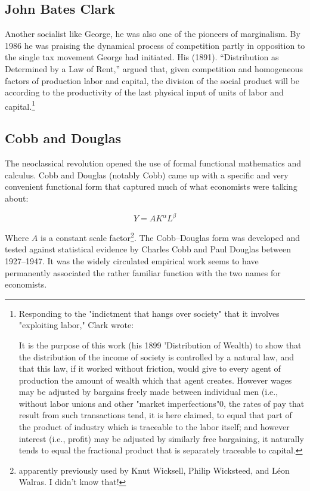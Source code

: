   \subsection{John Bates Clark}
  Another socialist like George, he was also one of the pioneers of marginalism. By 1986 he was praising the dynamical process of competition partly in opposition to the single tax movement George had initiated.  His (1891). ``Distribution as Determined by a Law of Rent,'' argued that, given  competition and homogeneous factors of production labor and capital, the division of the social product will be according to the productivity of the last physical input of units of labor and capital.\footnote{Responding to the "indictment that hangs over society" that it involves "exploiting labor," Clark wrote:

    It is the purpose of this work (his 1899 'Distribution of Wealth) to show that the distribution of the income of society is controlled by a natural law, and that this law, if it worked without friction, would give to every agent of production the amount of wealth which that agent creates. However wages may be adjusted by bargains freely made between individual men (i.e., without labor unions and other "market imperfections"0, the rates of pay that result from such transactions tend, it is here claimed, to equal that part of the product of industry which is traceable to the labor itself; and however interest (i.e., profit) may be adjusted by similarly free bargaining, it naturally tends to equal the fractional product that is separately traceable to capital.} 
  
 \subsection{Cobb and Douglas}
 The neoclassical revolution opened the use of formal functional mathematics and calculus. Cobb and Douglas (notably Cobb) came up with a specific and very convenient functional form that captured much of what economists were talking about:
 
 \[Y=AK^\alpha L^\beta\]
 
 Where $A$ is a constant scale factor\footnote {apparently previously used by Knut Wicksell, Philip Wicksteed, and L\'eon Walras. I didn't know that!}. The Cobb–Douglas form was developed and tested against statistical evidence by Charles Cobb and Paul Douglas between 1927–1947. It was  the widely circulated empirical work seems to have permanently associated the rather familiar function with the two names for economists.
 
